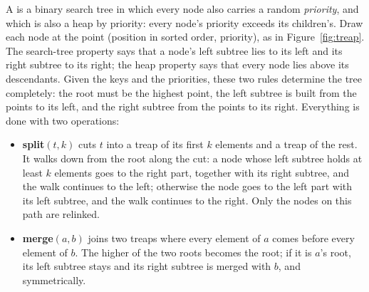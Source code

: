 A  is a binary search tree in which every node also carries a random \emph{priority}, and which is also a heap by
priority: every node's priority exceeds its children's. Draw each node at the point (position in sorted order, priority), as in
Figure~\ref{fig:treap}. The search-tree property says that a node's left subtree lies to its left and its right subtree to its
right; the heap property says that every node lies above its descendants. Given the keys and the priorities, these two rules
determine the tree completely: the root must be the highest point, the left subtree is built from the points to its left, and the
right subtree from the points to its right. Everything is done with two operations:
\begin{itemize}
  \item \textbf{split}$(t, k)$ cuts $t$ into a treap of its first $k$ elements and a treap of the rest. It walks down from the root
        along the cut: a node whose left subtree holds at least $k$ elements goes to the right part, together with its right
        subtree, and the walk continues to the left; otherwise the node goes to the left part with its left subtree, and the walk
        continues to the right. Only the nodes on this path are relinked.
  \item \textbf{merge}$(a, b)$ joins two treaps where every element of $a$ comes before every element of $b$. The higher of the two
        roots becomes the root; if it is $a$'s root, its left subtree stays and its right subtree is merged with $b$, and
        symmetrically.
\end{itemize}

